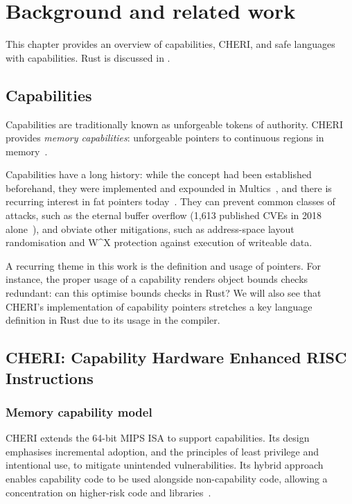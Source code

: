 \documentclass[dissertation.tex]{subfiles}
\begin{document}
\chapter{Background and related work}
\label{ch:bg}


 This chapter provides an overview of capabilities, CHERI,
and safe languages with capabilities.
Rust is discussed in .


\section{Capabilities}
\label{sec:bg-caps}
Capabilities are traditionally known as unforgeable tokens of authority.
CHERI provides \emph{memory capabilities}: unforgeable pointers to
continuous regions in memory~\cite{cheri-risc-2014}.

Capabilities have a long history: while the concept had been established
beforehand, they were implemented and expounded in
Multics~\cite{bell-lapadula}, and there is recurring interest in fat
pointers today~\cite{devietti-hardbound,lowfat-kwon}.
They can prevent common classes of attacks, such as the
eternal buffer overflow (1,613 published CVEs in 2018
alone~\cite{nist-nvd-overflow-2018}), and obviate other mitigations,
such as address-space layout randomisation and W\^{}X protection
against execution of writeable data.

A recurring theme in this work is the definition and usage of pointers.
For instance, the proper usage of a capability renders object bounds
checks redundant: can this optimise bounds checks in Rust?
We will also see that CHERI's implementation of capability pointers
stretches a key language definition in Rust due to its usage in the
compiler.


\section{CHERI: Capability Hardware Enhanced RISC Instructions}

\subsection{Memory capability model}

CHERI extends the 64-bit MIPS ISA to support capabilities.
Its design emphasises incremental adoption, and the principles of least
privilege and intentional use, to mitigate unintended vulnerabilities.
Its hybrid approach enables capability code to be used alongside
non-capability code, allowing a concentration on higher-risk code and
libraries~\cite{cheri-v6}.
\end{document}
